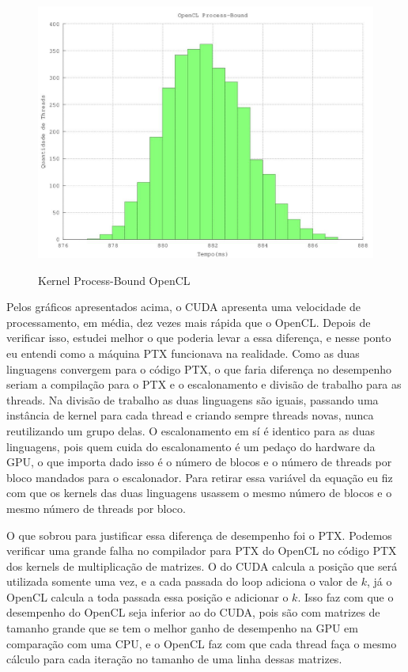 \begin{figure}[H]
  \begin{center}
    \includegraphics[scale=0.6]{resultados_opencl_process_histo.jpg}
    \label{fig:Kernel Process-Bound OpenCL}
    \caption{Kernel Process-Bound OpenCL}
  \end{center}
\end{figure}

Pelos gráficos apresentados acima, o CUDA apresenta uma velocidade de processamento, em média, dez vezes mais rápida que o OpenCL.
Depois de verificar isso, estudei melhor o que poderia levar a essa diferença, e nesse ponto eu entendi como a máquina PTX funcionava 
na realidade. Como as duas linguagens convergem para o código PTX, o que faria diferença no desempenho seriam
a compilação para o PTX e o escalonamento e divisão de trabalho para as threads. Na divisão de trabalho as duas linguagens
são iguais, passando uma instância de kernel para cada thread e criando sempre threads novas, nunca reutilizando um grupo delas.
O escalonamento em sí é identico para as duas linguagens, pois quem cuida do escalonamento é um pedaço do hardware da GPU, o que
importa dado isso é o número de blocos e o número de threads por bloco mandados para o escalonador. Para retirar essa variável da equação
eu fiz com que os kernels das duas linguagens usassem o mesmo número de blocos e o mesmo número de threads por bloco.

O que sobrou para justificar essa diferença de desempenho foi o PTX. Podemos verificar uma grande falha no compilador para PTX do OpenCL
no código PTX dos kernels de multiplicação de matrizes. O do CUDA calcula a posição que será utilizada somente uma vez, e a cada passada
do loop adiciona o valor de $k$, já o OpenCL calcula a toda passada essa posição e adicionar o $k$. Isso faz com que o desempenho do
OpenCL seja inferior ao do CUDA, pois são com matrizes de tamanho grande que se tem o melhor ganho de desempenho na GPU em comparação
com uma CPU, e o OpenCL faz com que cada thread faça o mesmo cálculo para cada iteração no tamanho de uma linha dessas matrizes.

